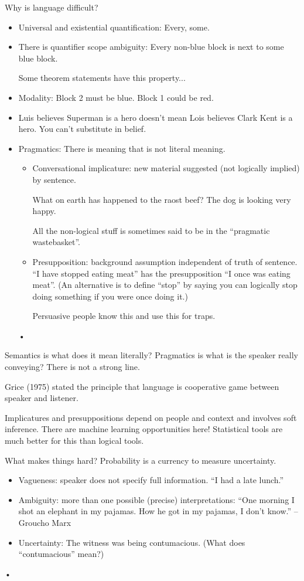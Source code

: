 Why is language difficult?
\begin{itemize}
\item
Universal and existential quantification: Every, some.
\item
There is quantifier scope ambiguity: Every non-blue block is next to some blue block. 

Some theorem statements have this property...

\item
Modality: Block 2 must be blue. Block 1 could be red. 
\item
Luis believes Superman is a hero doesn't mean Lois believes Clark Kent is a hero. You can't substitute in belief.
\item
Pragmatics: There is meaning that is not literal meaning.
\begin{itemize}
\item
Conversational implicature: new material suggested (not logically implied) by sentence.

What on earth has happened to the raost beef? The dog is looking very happy.

All the non-logical stuff is sometimes said to be in the ``pragmatic wastebasket''.
\item
Presupposition: background assumption independent of truth of sentence. ``I have stopped eating meat'' has the presupposition ``I once was eating meat''. 
 (An alternative is to define ``stop'' by saying you can logically stop doing something if you were once doing it.)

Persuasive people know this and use this for traps.
\end{itemize}•
\end{itemize}

Semantics is what does it mean literally? Pragmatics is what is the speaker really conveying? There is not a strong line. 

Grice (1975) stated the principle that language is cooperative game between speaker and listener.

Implicatures and presuppositions depend on people and  context and involves soft inference. There are machine learning opportunities here! Statistical tools are much better for this than logical tools.

What makes things hard? Probability is a currency to measure uncertainty.
\begin{itemize}
\item
Vagueness: speaker does not specify full information. ``I had a late lunch.''
\item
Ambiguity: more than one possible (precise) interpretations:
``One morning I shot an elephant in my pajamas. How he got in my pajamas, I don't know.'' --Groucho Marx
\item
Uncertainty: The witness was being contumacious. (What does ``contumacious'' mean?)
\end{itemize}•

